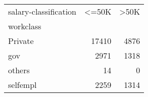 \begin{tabular}{lrr}
\toprule
salary-classification &   <=50K &   >50K \\
workclass &         &        \\
\midrule
Private   &   17410 &   4876 \\
gov       &    2971 &   1318 \\
others    &      14 &      0 \\
selfempl  &    2259 &   1314 \\
\bottomrule
\end{tabular}
